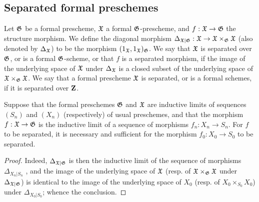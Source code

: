 \subsection{Separated formal preschemes}
\label{subsection-separated-formal-preschemes}

\begin{defn}[10.15.1]
\label{1.10.15.1}
Let $\mathfrak{G}$ be a formal prescheme, $\mathfrak{X}$ a formal $\mathfrak{G}$-prescheme, and $f:\fk{X}\to\fk{G}$ the structure morphism.
We define the diagonal morphism $\Delta_{\fk{X}|\fk{G}}:\fk{X}\to\fk{X}\times_\fk{G}\fk{X}$ (also denoted by $\Delta_\mathfrak{X}$) to be the morphism $(1_\mathfrak{X},1_\mathfrak{X})_\mathfrak{G}$.
We say that $\mathfrak{X}$ is separated over $\mathfrak{G}$, or is a formal $\mathfrak{G}$-scheme, or that $f$ is a separated morphism, if the image of the underlying space of $\mathfrak{X}$ under $\Delta_\mathfrak{X}$ is a closed subset of the underlying space of $\mathfrak{X}\times_\mathfrak{G}\mathfrak{X}$.
We say that a formal prescheme $\mathfrak{X}$ is separated, or is a formal schemes, if it is separated over $\mathbf{Z}$.
\end{defn}

\begin{prop}[10.15.2]
\label{1.10.15.2}
Suppose that the formal preschemes $\mathfrak{G}$ and $\mathfrak{X}$ are inductive limits of sequences $(S_n)$ and $(X_n)$ (respectively) of usual preschemes, and that the morphism $f:\fk{X}\to\fk{G}$ is the inductive limit of a sequence of morphisms $f_n:X_n\to S_n$.
For $f$ to be separated, it is necessary and sufficient for the morphism $f_0:X_0\to S_0$ to be separated.
\end{prop}

\begin{proof}
\label{proof-1.10.15.2}
Indeed, $\Delta_{\mathfrak{X}|\mathfrak{G}}$ is then the inductive limit of the sequence of morphisms $\Delta_{X_n|S_n}$ , and the image of the underlying space of $\mathfrak{X}$ (resp. of $\mathfrak{X}\times_\mathfrak{G}\mathfrak{X}$ under $\Delta_{\mathfrak{X}|\mathfrak{G}}$) is identical to the image of the underlying space of $X_0$ (resp. of $X_0\times_{S_0}X_0$) under $\Delta_{X_0|S_0}$;
whence the conclusion.
\end{proof}

